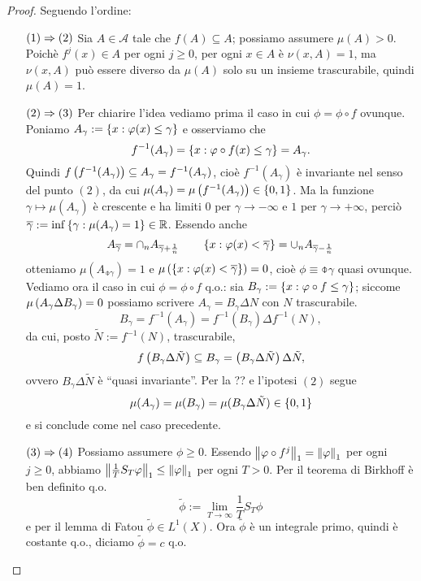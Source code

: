 \begin{proof} Seguendo l'ordine:\begin{itemize}
    \item[$(1)\Rightarrow(2)$] Sia $A\in\mathcal{A}$ tale che $f(A)\subseteq A$; possiamo assumere $\mu(A)>0$. Poichè $f^j(x)\in A$ per ogni $j\ge 0$, per ogni $x\in A$
	    è $\nu(x,A)=1$, ma $\nu(x,A)$ può essere diverso da $\mu(A)$ solo su un insieme trascurabile, quindi $\mu(A)=1$.
    \item[$(2)\Rightarrow(3)$] Per chiarire l'idea vediamo prima il caso in cui $\phi=\phi\circ f$ ovunque.
	    Poniamo $A_\gamma:=\left\{x:\varphi(x)\le\gamma\right\}$ e osserviamo che
	    \[ f^{-1}(A_\gamma)=\left\{x:\varphi\circ f(x)\le\gamma\right\}=A_\gamma. \]
	    Quindi $f\left(f^{-1}(A_\gamma)\right)\subseteq A_\gamma=f^{-1}(A_\gamma)$, cioè $f^{-1}(A_\gamma)$ è invariante nel senso del punto $(2)$,
	    da cui $\mu(A_\gamma)=\mu\left(f^{-1}(A_\gamma)\right)\in\left\{0,1\right\}$.
	    Ma la funzione $\gamma\mapsto\mu(A_\gamma)$ è crescente e ha limiti $0$ per $\gamma\to -\infty$ e $1$ per $\gamma\to +\infty$,
	    perciò $\overline{\gamma}:=\inf\left\{\gamma:\mu(A_\gamma)=1\right\}\in\mathbb{R}$. Essendo anche 
	    \[A_{\overline{\gamma}}=\cap_n A_{\overline{\gamma}+\frac{1}{n}} \qquad \left\{x:\varphi(x)<\overline{\gamma}\right\}=\cup_n A_{\overline{\gamma}-\frac{1}{n}}\]
	    otteniamo $\mu(A_{\obar{\gamma}})=1$
	    e $\mu\left(\left\{x:\varphi(x)<\overline{\gamma}\right\}\right)=0$, cioè $\phi\equiv\obar{\gamma}$ quasi ovunque. 
	    Vediamo ora il caso in cui $\phi=\phi\circ f$ q.o.: sia $B_\gamma:=\left\{x:\varphi\circ f\le\gamma\right\}$;
	    siccome $\mu\left(A_\gamma\Delta B_\gamma\right)=0$ possiamo scrivere $A_\gamma=B_\gamma\Delta N$ con $N$ trascurabile.
	    \[B_\gamma=f^{-1}(A_\gamma)=f^{-1}(B_\gamma)\Delta f^{-1}(N),\]
	    da cui, posto $\tilde{N}:=f^{-1}(N)$, trascurabile,
	    \[f\left(B_\gamma\Delta\tilde{N}\right)\subseteq B_\gamma=\left(B_\gamma\Delta\tilde{N}\right)\Delta\tilde{N},\]
	    ovvero $B_\gamma\Delta\tilde{N}$ è ``quasi invariante''. Per la ?? e l'ipotesi $(2)$ segue
	    \[\mu(A_\gamma)=\mu(B_\gamma)=\mu(B_\gamma\Delta\tilde{N})\in\left\{0,1\right\}\]
	    e si conclude come nel caso precedente.
    \item[$(3)\Rightarrow (4)$] Possiamo assumere $\phi\ge 0$.
	    Essendo $\left\|\varphi\circ f^j\right\|_1=\left\|\varphi\right\|_1$ per ogni $j\ge 0$, abbiamo $\left\|\frac{1}{T}S_T\varphi\right\|_1\le \left\|\varphi\right\|_1$ per ogni $T>0$.
	    Per il teorema di Birkhoff è ben definito q.o. 
	    \[\tilde{\phi}:=\lim_{T\to\infty}\frac{1}{T}S_T\phi\]
	    e per il lemma di Fatou $\tilde{\phi}\in L^1(X)$. Ora $\tilde{\phi}$ è un integrale primo, quindi è costante q.o., diciamo $\tilde{\phi}=c$ q.o. 

\end{itemize}
\end{proof}
